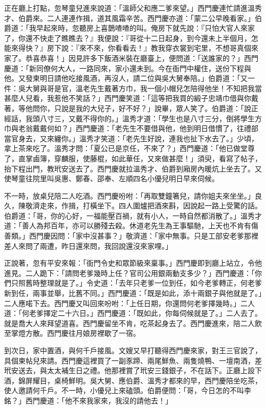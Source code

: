 正在廳上打點，忽琴童兒進來說道：「溫師父和應二爹來望。」西門慶連忙請進溫秀才、伯爵來。二人連連作揖，道其風霜辛苦。西門慶亦道：「蒙二公早晚看家。」伯爵道：「我早起來時，忽聽房上喜鵲喳喳的叫。俺房下就先說：『只怕大官人來家了，你還不快走了瞧瞧去？』我便說：『哥從十二日起身，到今還未上半個月，怎能來得快？』房下說：『來不來，你看看去！』教我穿衣裳到宅里，不想哥真個來家了。恭喜恭喜！」因見許多下飯酒米裝在廳臺上，便問道：「送誰家的？」西門慶道：「新同僚何大人，一路同來，家小還未到。今在衙門中權住，送份下程與他。又發柬明日請他吃接風酒，再沒人，請二位與吳大舅奉陪。」伯爵道：「又一件：吳大舅與哥是官，溫老先生戴著方巾，我一個小帽兒怎陪得他坐！不知把我當甚麼人兒看，我惹他不笑話？」西門慶笑道：「這等把我買的緞子忠靖巾借與你戴著，等他問你，只說是我的大兒子，好不好？」說畢，眾人笑了。伯爵道：「說正經話，我頭八寸三，又戴不得你的。」溫秀才道：「學生也是八寸三分，倒將學生方巾與老翁戴戴何如？」西門慶道：「老先生不要借與他，他到明日借慣了，往禮部當官身去，又來纏你。」溫秀才笑道：「老先生好說，連我也扯下水去了。」少頃，拿上茶來吃了。溫秀才問：「夏公已是京任，不來了？」西門慶道：「他已做堂尊了，直掌鹵簿，穿麟服，使藤棍，如此華任，又來做甚麼！」須臾，看寫了帖子，抬下程出門，教玳安送去了。西門慶就拉溫秀才、伯爵到廂房內暖炕上坐去了。又使琴童往院里叫吳惠、鄭春、邵奉、左順四名小優兒明日早來伺候。

不一時，放桌兒陪二人吃酒。西門慶吩咐：「再取雙鐘箸兒，請你姐夫來坐坐。」良久，陳敬濟走來，作揖，打橫坐下。四人圍爐把酒來斟，因說起一路上受驚的話。伯爵道：「哥，你的心好，一福能壓百禍，就有小人，一時自然都消散了。」溫秀才道：「善人為邦百年，亦可以勝殘去殺。休道老先生為王事驅馳，上天也不肯有傷善類。」西門慶因問：「家中沒甚事？」敬濟道：「家中無事。只是工部安老爹那裡差人來問了兩遭，昨日還來問，我回說還沒來家哩。」

正說著，忽有平安來報：「衙門令史和眾節級來稟事。」西門慶即到廳上站立，令他進見。二人跪下：「請問老爹幾時上任？官司公用銀兩動支多少？」西門慶道：「你們只照舊時整理就是了。」令史道：「去年只老爹一位到任，如今老爹轉正，何老爹新到任，兩事並舉，比舊不同。」西門慶道：「既是如此，添十兩銀子與他就是了。」二人應喏下去。西門慶又叫回來吩咐：「上任日期，你還問何老爹擇幾時。」二人道：「何老爹擇定二十六日。」西門慶道：「既如此，你每伺候就是了。」二人去了。就是喬大人來拜望道喜。西門慶留坐不肯，吃茶起身去了。西門慶進來，陪二人飲至掌燈方散。西門慶往月娘房裡歇了一宿。

到次日，家中置酒，與何千戶接風。文嫂又早打聽得西門慶來家，對王三官說了，具個柬帖兒來請。西門慶這裡買了一副豕蹄、兩尾鮮魚、兩隻燒鴨、一壇南酒，差玳安送去，與太太補生日之禮。他那裡賞了玳安三錢銀子，不在話下。正廳上設下酒，錦屏耀目，桌椅鮮明。吳大舅、應伯爵、溫秀才都來的早，西門慶陪坐吃茶，使人邀請何千戶。不一時，小優兒上來磕頭。伯爵便問：「哥，今日怎的不叫李銘？」西門慶道：「他不來我家來，我沒的請他去！」

